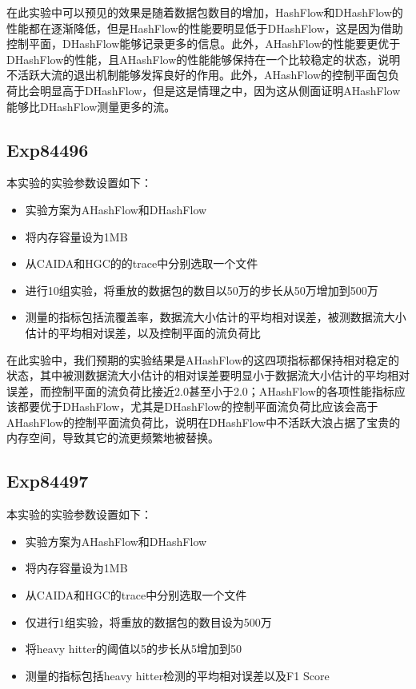 \documentclass{article}
\begin{document}
在此实验中可以预见的效果是随着数据包数目的增加，HashFlow和DHashFlow的性能都在逐渐降低，但是HashFlow的性能要明显低于DHashFlow，这是因为借助控制平面，DHashFlow能够记录更多的信息。此外，AHashFlow的性能要更优于DHashFlow的性能，且AHashFlow的性能能够保持在一个比较稳定的状态，说明不活跃大流的退出机制能够发挥良好的作用。此外，AHashFlow的控制平面包负荷比会明显高于DHashFlow，但是这是情理之中，因为这从侧面证明AHashFlow能够比DHashFlow测量更多的流。

\subsection{Exp84496}
本实验的实验参数设置如下：
\begin{itemize}
\item 实验方案为AHashFlow和DHashFlow
\item 将内存容量设为1MB
\item 从CAIDA和HGC的的trace中分别选取一个文件
\item 进行10组实验，将重放的数据包的数目以50万的步长从50万增加到500万
\item 测量的指标包括流覆盖率，数据流大小估计的平均相对误差，被测数据流大小估计的平均相对误差，以及控制平面的流负荷比
\end{itemize}

在此实验中，我们预期的实验结果是AHashFlow的这四项指标都保持相对稳定的状态，其中被测数据流大小估计的相对误差要明显小于数据流大小估计的平均相对误差，而控制平面的流负荷比接近2.0甚至小于2.0；AHashFlow的各项性能指标应该都要优于DHashFlow，尤其是DHashFlow的控制平面流负荷比应该会高于AHashFlow的控制平面流负荷比，说明在DHashFlow中不活跃大浪占据了宝贵的内存空间，导致其它的流更频繁地被替换。

\subsection{Exp84497}
本实验的实验参数设置如下：
\begin{itemize}
\item 实验方案为AHashFlow和DHashFlow
\item 将内存容量设为1MB
\item 从CAIDA和HGC的trace中分别选取一个文件
\item 仅进行1组实验，将重放的数据包的数目设为500万
\item 将heavy hitter的阈值以5的步长从5增加到50
\item 测量的指标包括heavy hitter检测的平均相对误差以及F1 Score
\end{itemize}
\end{document}
